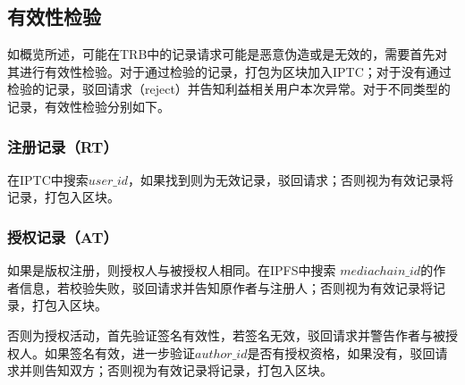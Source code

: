 \documentclass[withoutpreface,bwprint]{cumcmthesis} %
\begin{document}
\subsection{有效性检验}
如概览所述，可能在TRB中的记录请求可能是恶意伪造或是无效的，需要首先对其进行有效性检验。对于通过检验的记录，打包为区块加入IPTC；对于没有通过检验的记录，驳回请求（reject）并告知利益相关用户本次异常。对于不同类型的记录，有效性检验分别如下。
\subsubsection{注册记录（RT）}
在IPTC中搜索$user\_id$，如果找到则为无效记录，驳回请求；否则视为有效记录将记录，打包入区块。
\\


\subsubsection{授权记录（AT）}
如果是版权注册，则授权人与被授权人相同。在IPFS中搜索 $mediachain\_id$的作者信息，若校验失败，驳回请求并告知原作者与注册人；否则视为有效记录将记录，打包入区块。

否则为授权活动，首先验证签名有效性，若签名无效，驳回请求并警告作者与被授权人。如果签名有效，进一步验证$author\_id$是否有授权资格，如果没有，驳回请求并则告知双方；否则视为有效记录将记录，打包入区块。
\\
\end{document}
